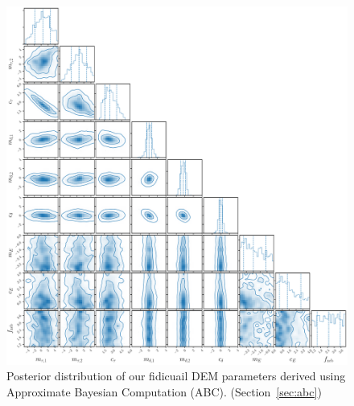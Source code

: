 \begin{figure}
\begin{center}
    \includegraphics[width=\textwidth]{figs/abc.pdf}
    \caption{Posterior distribution of our fidicuail DEM parameters derived
    using Approximate Bayesian Computation (ABC). (Section~\ref{sec:abc})}
\label{fig:abc_nonslab}
\end{center}
\end{figure}

